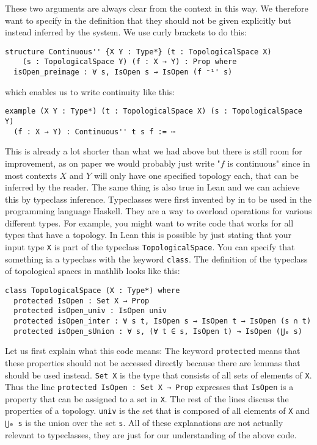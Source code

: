 These two arguments are always clear from the context in this way. 
We therefore want to specify in the definition that they should not be given explicitly but instead inferred by the system.
We use curly brackets to do this: 

\begin{lstlisting}
structure Continuous'' {X Y : Type*} (t : TopologicalSpace X) 
    (s : TopologicalSpace Y) (f : X → Y) : Prop where
  isOpen_preimage : ∀ s, IsOpen s → IsOpen (f ⁻¹' s)
\end{lstlisting}

which enables us to write continuity like this: 

\begin{lstlisting}
example (X Y : Type*) (t : TopologicalSpace X) (s : TopologicalSpace Y) 
  (f : X → Y) : Continuous'' t s f := ⋯
\end{lstlisting}

This is already a lot shorter than what we had above but there is still room for improvement, as on paper we would probably just write "$f$ is continuous" since in most contexts $X$ and $Y$ will only have one specified topology each, that can be inferred by the reader.
The same thing is also true in Lean and we can achieve this by typeclass inference.
Typeclasses were first invented by  in \cite{Wadler1989} to be used in the programming language Haskell. 
They are a way to overload operations for various different types. 
For example, you might want to write code that works for all types that have a topology. 
In Lean this is possible by just stating that your input type \lstinline{X} is part of the typeclass \lstinline{TopologicalSpace}. 
You can specify that something ia a typeclass with the keyword \lstinline{class}. 
The definition of the typeclass of topological spaces in mathlib looks like this: 
\href{https://github.com/leanprover-community/mathlib4/blob/93828f4cd10fb8cab31700b110fd2751d36bf1b8/Mathlib/Topology/Defs/Basic.lean#L59-L71}{\faExternalLink}

\begin{lstlisting}
class TopologicalSpace (X : Type*) where
  protected IsOpen : Set X → Prop
  protected isOpen_univ : IsOpen univ
  protected isOpen_inter : ∀ s t, IsOpen s → IsOpen t → IsOpen (s ∩ t)
  protected isOpen_sUnion : ∀ s, (∀ t ∈ s, IsOpen t) → IsOpen (⋃₀ s)
\end{lstlisting}

Let us first explain what this code means: 
The keyword \lstinline{protected} means that these properties should not be accessed directly because there are lemmas that should be used instead. 
\lstinline{Set X} is the type that consists of all sets of elements of \lstinline{X}.
Thus the line \lstinline{protected IsOpen : Set X → Prop} expresses that \lstinline{IsOpen} is a property that can be assigned to a set in \lstinline{X}.
The rest of the lines discuss the properties of a topology.
\lstinline{univ} is the set that is composed of all elements of \lstinline{X} and \lstinline{⋃₀ s} is the union over the set \lstinline{s}. 
All of these explanations are not actually relevant to typeclasses, they are just for our understanding of the above code. 

